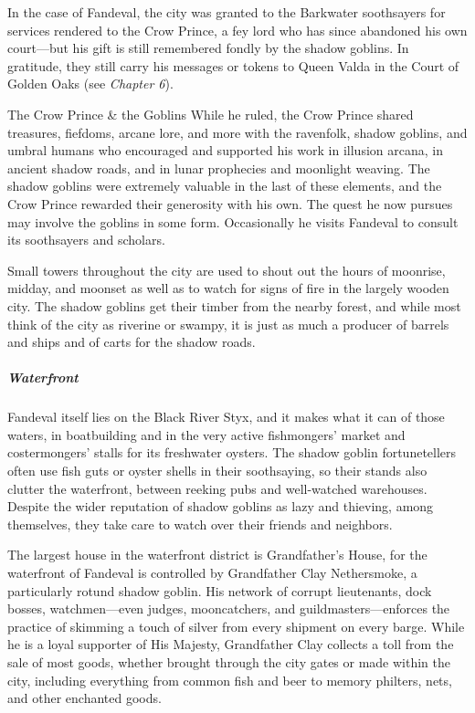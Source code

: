 \documentclass[10pt,a4paper,twoside,bg=print,twocolumn,openany,nodeprecatedcode]{dndbook}
\begin{document}
In the case of Fandeval, the city was granted to the Barkwater soothsayers for services rendered to the Crow Prince, a fey lord who has since abandoned his own court—but his gift is still remembered fondly by the shadow goblins. In gratitude, they still carry his messages or tokens to Queen Valda in the Court of Golden Oaks (see \textit{Chapter 6}).

\begin{DndSidebar}[float=!b]{The Crow Prince \& the Goblins}
While he ruled, the Crow Prince shared treasures, fiefdoms, arcane lore, and more with the ravenfolk, shadow goblins, and umbral humans who encouraged and supported his work in illusion arcana, in ancient shadow roads, and in lunar prophecies and moonlight weaving. The shadow goblins were extremely valuable in the last of these elements, and the Crow Prince rewarded their generosity with his own. The quest he now pursues may involve the goblins in some form. Occasionally he visits Fandeval to consult its soothsayers and scholars.



\end{DndSidebar}

Small towers throughout the city are used to shout out the hours of moonrise, midday, and moonset as well as to watch for signs of fire in the largely wooden city. The shadow goblins get their timber from the nearby forest, and while most think of the city as riverine or swampy, it is just as much a producer of barrels and ships and of carts for the shadow roads.

\subparagraph{Waterfront}
Fandeval itself lies on the Black River Styx, and it makes what it can of those waters, in boatbuilding and in the very active fishmongers' market and costermongers' stalls for its freshwater oysters. The shadow goblin fortunetellers often use fish guts or oyster shells in their soothsaying, so their stands also clutter the waterfront, between reeking pubs and well-watched warehouses. Despite the wider reputation of shadow goblins as lazy and thieving, among themselves, they take care to watch over their friends and neighbors.

The largest house in the waterfront district is Grandfather's House, for the waterfront of Fandeval is controlled by Grandfather Clay Nethersmoke, a particularly rotund shadow goblin. His network of corrupt lieutenants, dock bosses, watchmen—even judges, mooncatchers, and guildmasters—enforces the practice of skimming a touch of silver from every shipment on every barge. While he is a loyal supporter of His Majesty, Grandfather Clay collects a toll from the sale of most goods, whether brought through the city gates or made within the city, including everything from common fish and beer to memory philters, nets, and other enchanted goods.
\end{document}
